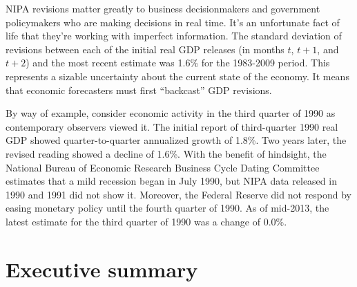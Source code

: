 NIPA revisions matter greatly to business decisionmakers and 
government policymakers who are making decisions in real time.  
It's an unfortunate fact of life that they're working with imperfect information. 
The standard deviation of revisions between each of the initial real GDP releases 
(in months $t$, $t+1$, and $t+2$) and the most recent estimate was 1.6\% 
for the 1983-2009 period. This represents a sizable uncertainty about 
the current state of the economy. It means
that economic forecasters must first ``backcast'' GDP revisions. 

By way of example, consider economic activity in the third quarter of 
1990 as contemporary observers viewed it. 
The initial report of third-quarter 1990 
real GDP showed quarter-to-quarter annualized growth of 1.8\%. 
Two years later, the revised reading showed a decline of 1.6\%. 
With the benefit of hindsight, the National
Bureau of Economic Research Business Cycle Dating Committee estimates that a 
mild recession began in July 1990, but NIPA data released in 1990 and 1991 did 
not show it. Moreover, the Federal Reserve did not respond by easing monetary policy 
until the fourth quarter of 1990. 
As of mid-2013, the latest estimate for the third quarter of 1990 was a change 
of 0.0\%.  



\section*{Executive summary}

